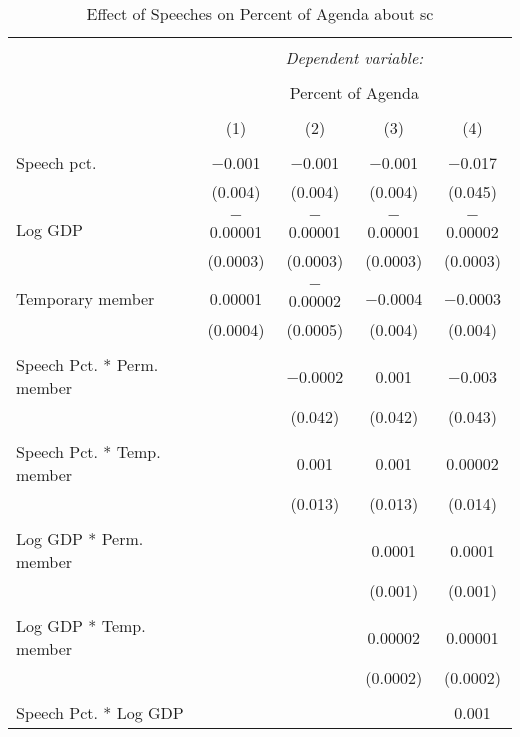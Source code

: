 
\begin{table}[!htbp] \centering 
  \caption{Effect of Speeches on Percent of Agenda about  sc} 
  \label{} 
\begin{tabular}{@{\extracolsep{5pt}}lcccc} 
\\[-1.8ex]\hline 
\hline \\[-1.8ex] 
 & \multicolumn{4}{c}{\textit{Dependent variable:}} \\ 
\cline{2-5} 
\\[-1.8ex] & \multicolumn{4}{c}{Percent of Agenda} \\ 
\\[-1.8ex] & (1) & (2) & (3) & (4)\\ 
\hline \\[-1.8ex] 
 Speech pct. & $-$0.001 & $-$0.001 & $-$0.001 & $-$0.017 \\ 
  & (0.004) & (0.004) & (0.004) & (0.045) \\ 
  & & & & \\ 
 Log GDP & $-$0.00001 & $-$0.00001 & $-$0.00001 & $-$0.00002 \\ 
  & (0.0003) & (0.0003) & (0.0003) & (0.0003) \\ 
  & & & & \\ 
 Temporary member & 0.00001 & $-$0.00002 & $-$0.0004 & $-$0.0003 \\ 
  & (0.0004) & (0.0005) & (0.004) & (0.004) \\ 
  & & & & \\ 
 Speech Pct. * Perm. member &  & $-$0.0002 & 0.001 & $-$0.003 \\ 
  &  & (0.042) & (0.042) & (0.043) \\ 
  & & & & \\ 
 Speech Pct. * Temp. member &  & 0.001 & 0.001 & 0.00002 \\ 
  &  & (0.013) & (0.013) & (0.014) \\ 
  & & & & \\ 
 Log GDP * Perm. member &  &  & 0.0001 & 0.0001 \\ 
  &  &  & (0.001) & (0.001) \\ 
  & & & & \\ 
 Log GDP * Temp. member &  &  & 0.00002 & 0.00001 \\ 
  &  &  & (0.0002) & (0.0002) \\ 
  & & & & \\ 
 Speech Pct. * Log GDP &  &  &  & 0.001 \\ 

\end{tabular}
\end{table}
